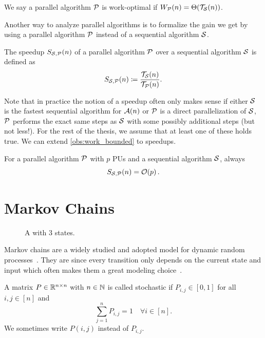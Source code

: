 \noindent We say a parallel algorithm $\mathcal{P}$ is work-optimal if $W_{\mathcal{P}}(n) = \Theta\!\left(\mathcal{T}_{\mathcal{S}}(n)\right)$.

Another way to analyze parallel algorithms is to formalize the gain we get by using a parallel algorithm $\mathcal{P}$ instead of a sequential algorithm $\mathcal{S}$.

\begin{definition}[Speedup]
  The speedup $S_{\mathcal{S}, \mathcal{P}}(n)$ of a parallel algorithm $\mathcal{P}$ over a sequential algorithm $\mathcal{S}$ is defined as \[
    S_{\mathcal{S}, \mathcal{P}}(n) \coloneqq \frac{\mathcal{T}_{\mathcal{S}}(n)}{\mathcal{T}_{\mathcal{P}}(n)}.
  \]
\end{definition}

Note that in practice the notion of a speedup often only makes sense if either $\mathcal{S}$ is the fastest sequential algorithm for $\mathcal{A}(n)$ or $\mathcal{P}$ is a direct parallelization of $\mathcal{S}$, \ie $\mathcal{P}$ performs the exact same steps as $\mathcal{S}$ with some possibly additional steps (but not less!).
For the rest of the thesis, we assume that at least one of these holds true.
We can extend \cref{obs:work_bounded} to speedups.

\begin{observation}
  For a parallel algorithm $\mathcal{P}$ with $p$ PUs and a sequential algorithm $\mathcal{S}$, always \[
    S_{\mathcal{S}, \mathcal{P}}(n) = \mathcal O\!\left(p\right).
  \]
\end{observation}


\section{Markov Chains}
\begin{figure}[t]
  \centering
  
  
  \caption{
    A \markov with $3$ states. 
  }
  \label{fig:markov_example}
\end{figure}

Markov chains are a widely studied and adopted model for dynamic random processes~\cite{MCApp1,MCApp2,DBLP:conf/alenex/GkantsidisMMZ03,DBLP:conf/alenex/StantonP11}.
They are  since every transition only depends on the current state and input which often makes them a great modeling choice~\cite{MarkovMemoryless}.

\begin{definition}
  A matrix $P \in \mathbb R^{n \times n}$ with $n \in \mathbb N$ is called stochastic if $P_{i, j} \in [0, 1]$ for all $i, j \in [n]$ and \[
    \sum_{j = 1}^{n}P_{i, j} = 1 \quad \forall i \in [n].
  \] We sometimes write $P(i, j)$ instead of $P_{i,j}$.
\end{definition}

